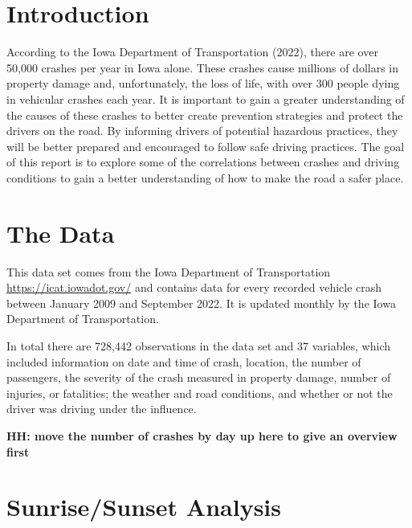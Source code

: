 \documentclass[conference,final,]{IEEEtran}
\begin{document}
\clearpage

\hypertarget{introduction}{%
\section{Introduction}\label{introduction}}

According to the Iowa Department of Transportation (2022), there are over 50,000 crashes per year in Iowa alone. These crashes cause millions of dollars in property damage and, unfortunately, the loss of life, with over 300 people dying in vehicular crashes each year. It is important to gain a greater understanding of the causes of these crashes to better create prevention strategies and protect the drivers on the road. By informing drivers of potential hazardous practices, they will be better prepared and encouraged to follow safe driving practices. The goal of this report is to explore some of the correlations between crashes and driving conditions to gain a better understanding of how to make the road a safer place.

\hypertarget{the-data}{%
\section{The Data}\label{the-data}}

This data set comes from the Iowa Department of Transportation \url{https://icat.iowadot.gov/} and contains data for every recorded vehicle crash between January 2009 and September 2022. It is updated monthly by the Iowa Department of Transportation.

In total there are 728,442 observations in the data set and 37 variables, which included information on date and time of crash, location, the number of passengers, the severity of the crash measured in property damage, number of injuries, or fatalities; the weather and road conditions, and whether or not the driver was driving under the influence.

\textbf{HH: move the number of crashes by day up here to give an overview first}

\hypertarget{sunrisesunset-analysis}{%
\section{Sunrise/Sunset Analysis}\label{sunrisesunset-analysis}}
\end{document}
